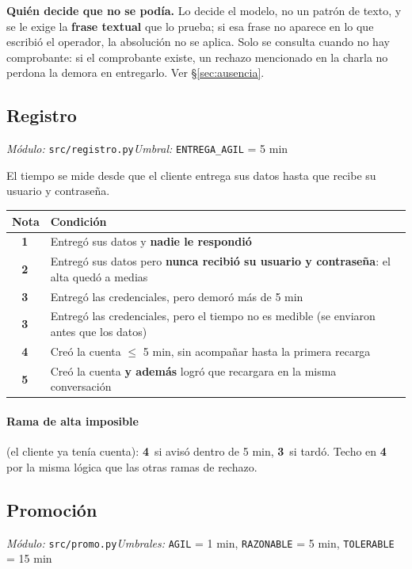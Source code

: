 \documentclass[11pt,a4paper]{article}
\newcommand{\cod}[1]{\texttt{\small #1}}
\newcommand{\est}[1]{\textbf{#1}\,\raisebox{0.5pt}{$\star$}}
\begin{document}
\begin{nota}
\textbf{Quién decide que no se podía.} Lo decide el modelo, no un patrón de texto, y se le
exige la \textbf{frase textual} que lo prueba; si esa frase no aparece en lo que escribió
el operador, la absolución no se aplica. Solo se consulta cuando no hay comprobante: si el
comprobante existe, un rechazo mencionado en la charla no perdona la demora en entregarlo.
Ver \S\ref{sec:ausencia}.
\end{nota}

\subsection{Registro}
\emph{Módulo:} \cod{src/registro.py}\quad\emph{Umbral:} \cod{ENTREGA\_AGIL} = 5 min

El tiempo se mide desde que el cliente entrega sus datos hasta que recibe su usuario y
contraseña.

\begin{center}
\begin{tabularx}{\textwidth}{@{}cX@{}}
\toprule
\textbf{Nota} & \textbf{Condición} \\
\midrule
\est{1} & Entregó sus datos y \textbf{nadie le respondió} \\
\est{2} & Entregó sus datos pero \textbf{nunca recibió su usuario y contraseña}: el alta quedó a medias \\
\est{3} & Entregó las credenciales, pero demoró más de 5 min \\
\est{3} & Entregó las credenciales, pero el tiempo no es medible (se enviaron antes que los datos) \\
\est{4} & Creó la cuenta $\le$ 5 min, sin acompañar hasta la primera recarga \\
\est{5} & Creó la cuenta \textbf{y además} logró que recargara en la misma conversación \\
\bottomrule
\end{tabularx}
\end{center}

\paragraph{Rama de alta imposible} (el cliente ya tenía cuenta): \est{4} si avisó
dentro de 5 min, \est{3} si tardó. Techo en \est{4} por la misma lógica que las otras
ramas de rechazo.

\subsection{Promoción}
\emph{Módulo:} \cod{src/promo.py}\quad\emph{Umbrales:} \cod{AGIL} = 1 min,
\cod{RAZONABLE} = 5 min, \cod{TOLERABLE} = 15 min
\end{document}
